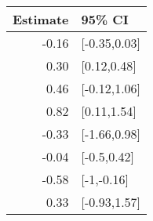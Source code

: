 \begin{tabular}{rl}
  \hline
Estimate & 95\% CI \\ 
  \hline
-0.16 & [-0.35,0.03] \\ 
  0.30 & [0.12,0.48] \\ 
  0.46 & [-0.12,1.06] \\ 
  0.82 & [0.11,1.54] \\ 
  -0.33 & [-1.66,0.98] \\ 
  -0.04 & [-0.5,0.42] \\ 
  -0.58 & [-1,-0.16] \\ 
  0.33 & [-0.93,1.57] \\ 
   \hline
\end{tabular}

